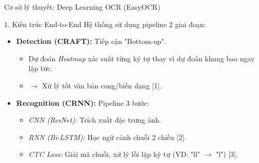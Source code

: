 \documentclass[10pt, aspectratio=169]{beamer}
\begin{document}
	\begin{frame}{Cơ sở lý thuyết: Deep Learning OCR (EasyOCR)}
		\small
		
		\begin{block}{1. Kiến trúc End-to-End}
			Hệ thống sử dụng pipeline 2 giai đoạn:
			\begin{itemize}
				\setlength\itemsep{0.8em} %
				
				\item \textbf{Detection (CRAFT):} Tiếp cận "Bottom-up".
				\begin{itemize} \footnotesize
					\item Dự đoán \textit{Heatmap} xác suất từng ký tự thay vì dự đoán khung bao ngay lập tức.
					\item $\to$ Xử lý tốt văn bản cong/biến dạng [1].
				\end{itemize}
				
				\item \textbf{Recognition (CRNN):} Pipeline 3 bước:
				\begin{itemize} \footnotesize
					\item \textit{CNN (ResNet):} Trích xuất đặc trưng ảnh.
					\item \textit{RNN (Bi-LSTM):} Học ngữ cảnh chuỗi 2 chiều [2].
					\item \textit{CTC Loss:} Giải mã chuỗi, xử lý lỗi lặp ký tự (VD: "ll" $\to$ "l") [3].
				\end{itemize}
			\end{itemize}
		\end{block}
	\end{frame}	
	
\end{document}
